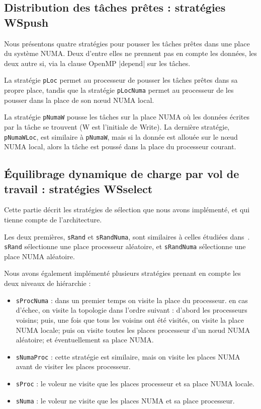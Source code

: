 \documentclass[parallelisme]{compas2016}
\begin{document}
\subsection{Distribution des tâches prêtes : stratégies WSpush}

Nous présentons quatre stratégies pour pousser les tâches prêtes dans une place
du système NUMA. Deux d'entre elles ne prennent pas en compte les données, les deux
autre si, via la clause OpenMP |depend| sur les tâches.

La stratégie \verb/pLoc/ permet au processeur de pousser les tâches prêtes dans
sa propre place, tandis que la stratégie \verb/pLocNuma/ permet au processeur de
les pousser dans la place de son nœud NUMA local.

La stratégie \verb/pNumaW/ pousse les tâches sur la place NUMA où les données
écrites par la tâche se trouvent (W est l'initiale de Write).
La dernière stratégie, \verb/pNumaWLoc/, est similaire à \verb/pNumaW/, mais
si la donnée est allouée sur le nœud NUMA local, alors la tâche est poussé dans
la place du processeur courant.


\subsection{Équilibrage dynamique de charge par vol de travail : stratégies WSselect}

Cette partie décrit les stratégies de sélection que nous avons implémenté, et
qui tienne compte de l'architecture.

Les deux premières, \verb/sRand/ et \verb/sRandNuma/, sont similaires à celles étudiées
dans~\cite{DBLP:journals/ijhpca/OlivierPWSP12}. \verb/sRand/ sélectionne une place
processeur aléatoire, et \verb/sRandNuma/ sélectionne une place NUMA aléatoire.

Nous avons également implémenté plusieurs stratégies prenant en compte les deux niveaux
de hiérarchie :

\begin{itemize}
  \item \verb/sProcNuma/ : dans un premier temps on visite la place du processeur.
    en cas d'échec, on visite la topologie dans l'ordre suivant : d'abord les
    processeurs voisins; puis, une fois que tous les voisins ont été visités, on
    visite la place NUMA locale; puis on visite toutes les places processeur d'un
    nœud NUMA aléatoire; et éventuellement sa place NUMA.
    
  \item \verb/sNumaProc/ : cette stratégie est similaire, mais on visite les places
    NUMA avant de visiter les places processeur.
  \item \verb/sProc/ : le voleur ne visite que les places processeur et sa place
    NUMA locale.
  \item \verb/sNuma/ : le voleur ne visite que les places NUMA et sa place processeur.
\end{itemize}
\end{document}
